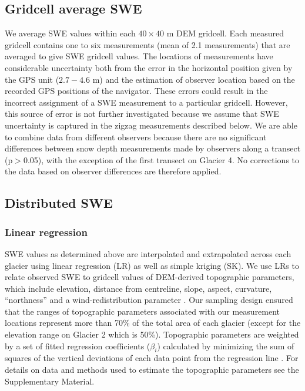 \documentclass[twocolumn, letterpaper]{igs}
\begin{document}
\subsection{Gridcell average SWE}

We average SWE values within each $40 \times 40$ m DEM gridcell. Each measured gridcell contains one to six measurements (mean of 2.1 measurements) that are averaged to give SWE gridcell values. The locations of measurements have considerable uncertainty both from the error in the horizontal position given by the GPS unit ($2.7 - 4.6$ m) and the estimation of observer location based on the recorded GPS positions of the navigator. These errors could result in the incorrect assignment of a SWE measurement to a particular gridcell. However, this source of error is not further investigated because we assume that SWE uncertainty is captured in the zigzag measurements described below. We are able to combine data from different observers because there are no significant differences between snow depth measurements made by observers along a transect (p$>$0.05), with the exception of the first transect on Glacier 4. No corrections to the data based on observer differences are therefore applied.

\subsection{Distributed SWE}

\subsubsection{Linear regression}

SWE values as determined above are interpolated and extrapolated across each glacier using linear regression (LR) as well as simple kriging (SK). We use LRs to relate observed SWE to gridcell values of DEM-derived topographic parameters, which include elevation, distance from centreline, slope, aspect, curvature, ``northness'' and a wind-redistribution parameter \citep[e.g.][]{McGrath2015}. Our sampling design ensured that the ranges of topographic parameters associated with our measurement locations represent more than 70\% of the total area of each glacier (except for the elevation range on Glacier 2 which is 50\%). Topographic parameters are weighted by a set of fitted regression coefficients ($\beta_i$) calculated by minimizing the sum of squares of the vertical deviations of each data point from the regression line \citep{Davis1986}. For details on data and methods used to estimate the topographic parameters see the Supplementary Material. 
\end{document}

